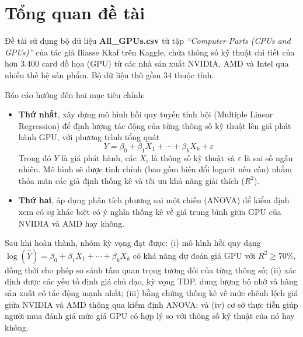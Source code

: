 \section{Tổng quan đề tài}
\label{sec:tong_quan}

Đề tài sử dụng bộ dữ liệu \textbf{All\_GPUs.csv} từ tập \textit{``Computer Parts (CPUs and GPUs)''} của tác giả Iliasse Kkaf trên Kaggle, chứa thông số kỹ thuật chi tiết của hơn 3.400 card đồ họa (GPU) từ các nhà sản xuất NVIDIA, AMD và Intel qua nhiều thế hệ sản phẩm. Bộ dữ liệu thô gồm 34 thuộc tính.

Báo cáo hướng đến hai mục tiêu chính:
\begin{itemize}
	\item \textbf{Thứ nhất}, xây dựng mô hình hồi quy tuyến tính bội (Multiple Linear Regression) để định lượng tác động của từng thông số kỹ thuật lên giá phát hành GPU, với phương trình tổng quát 
	\begin{equation*}
		Y = \beta_0 + \beta_1 X_1 + \cdots + \beta_k X_k + \varepsilon
	\end{equation*}
	Trong đó $Y$ là giá phát hành, các $X_i$ là thông số kỹ thuật và $\varepsilon$ là sai số ngẫu nhiên. Mô hình sẽ được tinh chỉnh (bao gồm biến đổi logarit nếu cần) nhằm thỏa mãn các giả định thống kê và tối ưu khả năng giải thích ($R^2$).
	\item \textbf{Thứ hai}, áp dụng phân tích phương sai một chiều (ANOVA) để kiểm định xem có sự khác biệt có ý nghĩa thống kê về giá trung bình giữa GPU của NVIDIA và AMD hay không.
\end{itemize}

Sau khi hoàn thành, nhóm kỳ vọng đạt được: (i) mô hình hồi quy dạng $\log(\hat{Y}) = \beta_0 + \beta_1 X_1 + \cdots + \beta_k X_k$ có khả năng dự đoán giá GPU với $R^2 \geq 70\%$, đồng thời cho phép so sánh tầm quan trọng tương đối của từng thông số; (ii) xác định được các yếu tố định giá chủ đạo, kỳ vọng TDP, dung lượng bộ nhớ và hãng sản xuất có tác động mạnh nhất; (iii) bằng chứng thống kê về mức chênh lệch giá giữa NVIDIA và AMD thông qua kiểm định ANOVA; và (iv) cơ sở thực tiễn giúp người mua đánh giá mức giá GPU có hợp lý so với thông số kỹ thuật của nó hay không.

